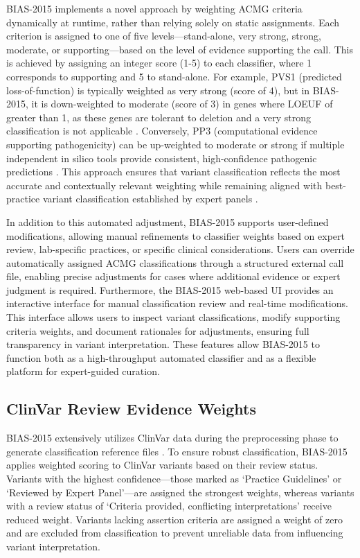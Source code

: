 \documentclass[unnumsec,webpdf,contemporary,large]{oup-authoring-template}
\theoremstyle{thmstyleone}
\theoremstyle{thmstyletwo}
\theoremstyle{thmstylethree}
\begin{document}
BIAS-2015 implements a novel approach by weighting ACMG criteria dynamically at runtime, rather than relying solely on static assignments. Each criterion is assigned to one of five levels—stand-alone, very strong, strong, moderate, or supporting—based on the level of evidence supporting the call. This is achieved by assigning an integer score (1-5) to each classifier, where 1 corresponds to supporting and 5 to stand-alone. For example, PVS1 (predicted loss-of-function) is typically weighted as very strong (score of 4), but in BIAS-2015, it is down-weighted to moderate (score of 3) in genes where LOEUF of greater than 1, as these genes are tolerant to deletion and a very strong classification is not applicable \cite{karczewski2020mutational}. Conversely, PP3 (computational evidence supporting pathogenicity) can be up-weighted to moderate or strong if multiple independent in silico tools provide consistent, high-confidence pathogenic predictions \cite{pejaver2022pp3bp4}. This approach ensures that variant classification reflects the most accurate and contextually relevant weighting while remaining aligned with best-practice variant classification established by expert panels \cite{clingen_erepo}. 

In addition to this automated adjustment, BIAS-2015 supports user-defined modifications, allowing manual refinements to classifier weights based on expert review, lab-specific practices, or specific clinical considerations. Users can override automatically assigned ACMG classifications through a structured external call file, enabling precise adjustments for cases where additional evidence or expert judgment is required. Furthermore, the BIAS-2015 web-based UI provides an interactive interface for manual classification review and real-time modifications. This interface allows users to inspect variant classifications, modify supporting criteria weights, and document rationales for adjustments, ensuring full transparency in variant interpretation. These features allow BIAS-2015 to function both as a high-throughput automated classifier and as a flexible platform for expert-guided curation.

\subsection{ClinVar Review Evidence Weights}
BIAS-2015 extensively utilizes ClinVar data during the preprocessing phase to generate classification reference files \cite{landrum2018clinvar}. To ensure robust classification, BIAS-2015 applies weighted scoring to ClinVar variants based on their review status. Variants with the highest confidence—those marked as ‘Practice Guidelines’ or ‘Reviewed by Expert Panel’—are assigned the strongest weights, whereas variants with a review status of ‘Criteria provided, conflicting interpretations’ receive reduced weight. Variants lacking assertion criteria are assigned a weight of zero and are excluded from classification to prevent unreliable data from influencing variant interpretation.
\end{document}
